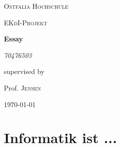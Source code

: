 \documentclass[12pt]{scrartcl}
\begin{document}
\begin{titlepage}
	\centering
	{\scshape\LARGE Ostfalia Hochschule \par}
	\vspace{1cm}
	{\scshape\Large EKdI-Projekt\par}
	\vspace{1.5cm}
	{\huge\bfseries Essay\par}
	\vspace{2cm}
	{\Large\itshape 70476503\par}
	\vfill
	supervised by\par
	Prof. \textsc{Jensen}

	\vfill

	{\large \today\par}
\end{titlepage}



\section{Informatik ist ...}
\end{document}
